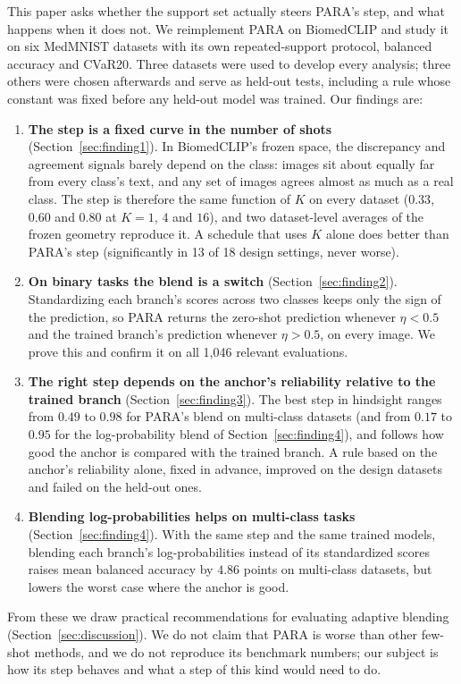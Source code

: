 This paper asks whether the support set actually steers PARA's step, and what happens when it does not.
We reimplement PARA on BiomedCLIP and study it on six MedMNIST datasets with its own repeated-support protocol, balanced accuracy and CVaR20.
Three datasets were used to develop every analysis; three others were chosen afterwards and serve as held-out tests,
including a rule whose constant was fixed before any held-out model was trained.
Our findings are:
\begin{enumerate}
  \item \textbf{The step is a fixed curve in the number of shots} (Section~\ref{sec:finding1}).
  In BiomedCLIP's frozen space, the discrepancy and agreement signals barely depend on the class:
  images sit about equally far from every class's text, and any set of images agrees almost as much as a real class.
  The step is therefore the same function of $K$ on every dataset ($0.33$, $0.60$ and $0.80$ at $K = 1$, $4$ and $16$),
  and two dataset-level averages of the frozen geometry reproduce it.
  A schedule that uses $K$ alone does better than PARA's step (significantly in 13 of 18 design settings, never worse).
  \item \textbf{On binary tasks the blend is a switch} (Section~\ref{sec:finding2}).
  Standardizing each branch's scores across two classes keeps only the sign of the prediction,
  so PARA returns the zero-shot prediction whenever $\eta < 0.5$ and the trained branch's prediction whenever $\eta > 0.5$, on every image.
  We prove this and confirm it on all 1,046 relevant evaluations.
  \item \textbf{The right step depends on the anchor's reliability relative to the trained branch} (Section~\ref{sec:finding3}).
  The best step in hindsight ranges from $0.49$ to $0.98$ for PARA's blend on multi-class datasets
  (and from $0.17$ to $0.95$ for the log-probability blend of Section~\ref{sec:finding4}), and follows how good the anchor is compared with the trained branch.
  A rule based on the anchor's reliability alone, fixed in advance, improved on the design datasets and failed on the held-out ones.
  \item \textbf{Blending log-probabilities helps on multi-class tasks} (Section~\ref{sec:finding4}).
  With the same step and the same trained models, blending each branch's log-probabilities instead of its standardized scores
  raises mean balanced accuracy by $4.86$ points on multi-class datasets, but lowers the worst case where the anchor is good.
\end{enumerate}
From these we draw practical recommendations for evaluating adaptive blending (Section~\ref{sec:discussion}).
We do not claim that PARA is worse than other few-shot methods, and we do not reproduce its benchmark numbers;
our subject is how its step behaves and what a step of this kind would need to do.

